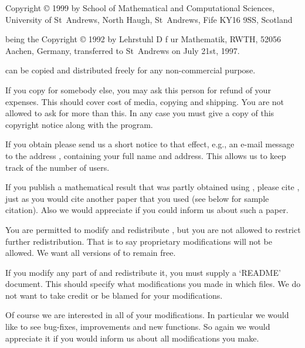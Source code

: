 


Copyright {\copyright} 1999 by
        School of Mathematical and Computational Sciences,
        University of St~Andrews,
        North Haugh, St~Andrews, Fife KY16 9SS, Scotland

being the Copyright {\copyright} 1992 by
        Lehrstuhl D f{ u}r Mathematik, RWTH,
        52056 Aachen, Germany,
transferred to St~Andrews on July 21st, 1997.

\medskip

{\GAP}   can be copied   and  distributed freely  for any  non-commercial
purpose.

If you copy {\GAP} for somebody else, you may ask this person for  refund
of your expenses.  This should cover cost of media, copying and shipping.
You are not allowed to ask for more than this.  In any case you must give
a copy of this copyright notice along with the program.

If you obtain {\GAP} please send us  a short notice to that effect, e.g.,
an  e-mail  message   to  the  address  ,
containing your full  name and address.  This  allows us to keep track of
the number of {\GAP} users.

If you  publish  a mathematical  result  that  was  partly obtained using
{\GAP}, please cite {\GAP}, just as you would cite another paper that you
used (see below for sample citation). Also   we would appreciate if you
could inform us  about such a paper.

You  are permitted  to modify and  redistribute  {\GAP},  but you are not
allowed  to restrict further redistribution.  That is to say  proprietary
modifications will  not  be allowed.  We want all  versions  of {\GAP} to
remain free.

If you  modify any part of {\GAP} and redistribute it,  you must supply a
`README'  document.   This should specify what modifications you made  in
which  files.  We do  not  want  to take  credit  or  be blamed  for your
modifications.

Of course we are interested in all of your modifications.  In  particular
we would like to see bug-fixes, improvements and new functions.  So again
we would appreciate it if you would inform us about all modifications you
make.

